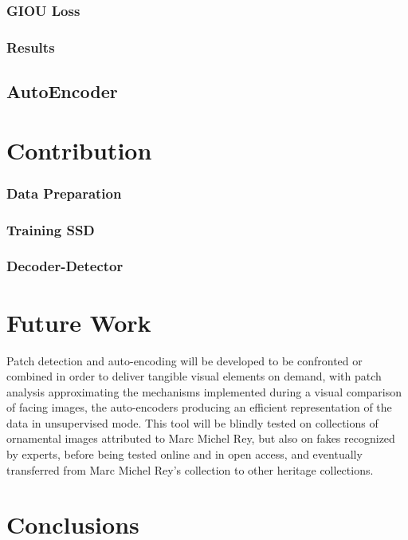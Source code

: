 \documentclass[12pt]{article}
\begin{document}
\subsubsection{GIOU Loss}

\subsubsection{Results}
\subsection{AutoEncoder}
\section{Contribution}
\subsubsection{Data Preparation}
\subsubsection{Training SSD}
\subsubsection{Decoder-Detector}
\section{Future Work}
Patch detection and auto-encoding will be developed to be confronted or combined in order to deliver tangible visual elements on demand, with patch analysis approximating the mechanisms implemented during a visual comparison of facing images, the auto-encoders producing an efficient representation of the data in unsupervised mode. This tool will be blindly tested on collections of ornamental images attributed to Marc Michel Rey, but also on fakes recognized by experts, before being tested online and in open access, and eventually transferred from Marc Michel Rey's collection to other heritage collections.
\section{Conclusions}
\end{document}
